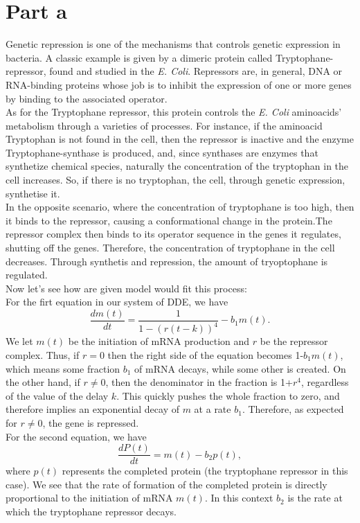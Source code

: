 \section{Part a}
Genetic repression is one of the mechanisms that controls genetic expression in bacteria. A classic example is given by a dimeric protein called Tryptophane-repressor, found and studied in the \textit{E. Coli}. Repressors are, in general, DNA or RNA-binding proteins whose job is to inhibit the expression of one or more genes by binding to the associated operator. \\
As for the Tryptophane repressor, this protein controls the \textit{E. Coli} aminoacids' metabolism through a varieties of processes. For instance, if the aminoacid Tryptophan is not found in the cell, then the repressor is inactive and the enzyme Tryptophane-synthase is produced, and, since synthases are enzymes that synthetize chemical species, naturally the concentration of the tryptophan in the cell increases. So, if there is no tryptophan, the cell, through genetic expression, synthetise it.\\
In the opposite scenario, where the concentration of tryptophane is too high, then it binds to the repressor, causing a conformational change in the protein.The repressor complex then binds to its operator sequence in the genes it regulates, shutting off the genes. Therefore, the concentration of tryptophane in the cell decreases. Through synthetis and repression, the amount of tryoptophane is regulated.\\
Now let's see how are given model would fit this process:\\
For the firt equation in our system of DDE, we have
$$
\frac{dm(t)}{dt} = \frac{1}{1-(r(t-k))^{4}} - b_{1}m(t).
$$
We let $m(t)$ be the initiation of mRNA production and $r$ be the repressor complex. Thus, if $r=0$ then the right side of the equation becomes 1-$b_{1}m(t)$, which means some fraction $b_{1}$ of mRNA decays, while some other is created. On the other hand, if $r \neq 0$, then the denominator in the fraction is 1+$r^{4}$, regardless of the value of the delay $k$. This quickly pushes the whole fraction to zero, and therefore implies an exponential decay of $m$ at a rate $b_{1}$. Therefore, as expected for $r \neq 0$, the gene is repressed.\\
For the second equation, we have
$$
\frac{dP(t)}{dt} = m(t) - b_{2}p(t),
$$
where $p(t)$ represents the completed protein (the tryptophane repressor in this case). We see that the rate of formation of the completed protein is directly proportional to the initiation of mRNA $m(t)$. In this context $b_{2}$ is the rate at which the tryptophane repressor decays.\\
